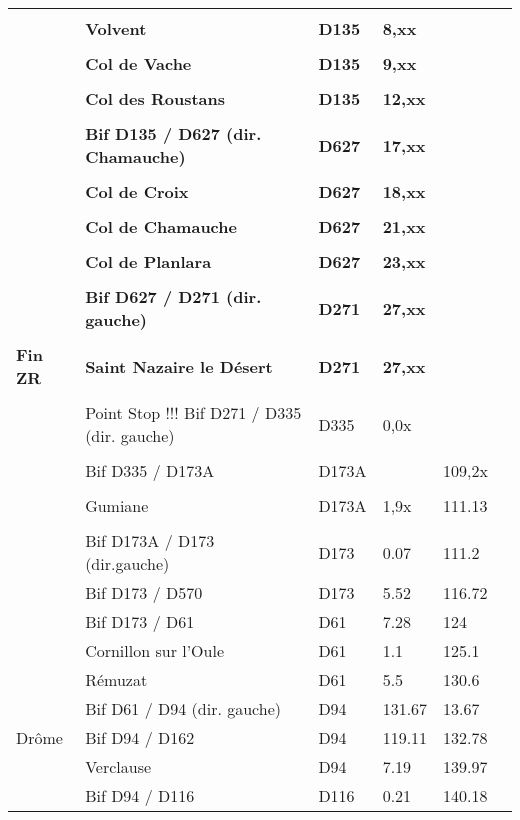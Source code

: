 \documentclass{article}%
\begin{document}
\begin{longtable}{p{2.25cm}|p{7.0cm}|p{1.5cm}|p{1.5cm}|p{1.5cm}|p{3.5cm}}
 & & & & & \\%
 &\textbf{Volvent}&\textbf{D135}&\textbf{8,xx}& & \\%
 & & & & & \\%
 &\textbf{Col de Vache }&\textbf{D135}&\textbf{9,xx}& & \\%
 & & & & & \\%
 &\textbf{Col des Roustans}&\textbf{D135}&\textbf{12,xx}& & \\%
 & & & & & \\%
 &\textbf{Bif D135 / D627 (dir. Chamauche)}&\textbf{D627}&\textbf{17,xx}& & \\%
 & & & & & \\%
 &\textbf{Col de Croix  }&\textbf{D627}&\textbf{18,xx}& & \\%
 & & & & & \\%
 &\textbf{Col de Chamauche }&\textbf{D627}&\textbf{21,xx}& & \\%
 & & & & & \\%
 &\textbf{Col de Planlara}&\textbf{D627}&\textbf{23,xx}& & \\%
 & & & & & \\%
 &\textbf{Bif D627 / D271 (dir. gauche)}&\textbf{D271}&\textbf{27,xx}& & \\%
 & & & & & \\%
\textbf{Fin ZR}&\textbf{Saint Nazaire le Désert}&\textbf{D271}&\textbf{ 27,xx }& & \\%
 & & & & & \\%
 &Point Stop !!! Bif D271 / D335 (dir. gauche)&D335& 0,0x & & \\%
 & & & & & \\%
 &Bif D335 / D173A&D173A& &109,2x& \\%
 & & & & & \\%
 &Gumiane&D173A&1,9x&111.13& \\%
 & & & & & \\%
 &Bif D173A / D173 (dir.gauche)&D173&0.07&111.2& \\%
 &Bif D173 / D570&D173&5.52&116.72& \\%
 &Bif D173 / D61&D61&7.28&124& \\%
 &Cornillon sur l'Oule&D61 &1.1&125.1& \\%
 &Rémuzat &D61&5.5&130.6& \\%
 &Bif D61 / D94 (dir. gauche)&D94&131.67&13.67& \\%
Drôme &Bif D94 / D162 &D94 &119.11&132.78& \\%
 &Verclause &D94&7.19&139.97& \\%
 &Bif D94 / D116 &D116&0.21&140.18& \\%

\end{longtable}
\end{document}
